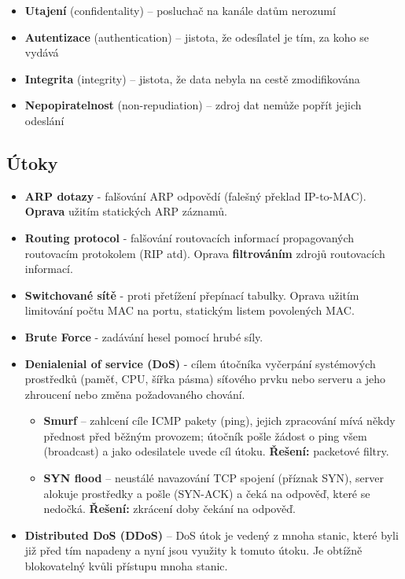 \begin{itemize}
\item \textbf{Utajení} (confidentality) – posluchač na kanále datům nerozumí
\item \textbf{Autentizace} (authentication) – jistota, že odesílatel je tím, za koho se vydává 
\item \textbf{Integrita} (integrity) – jistota, že data nebyla na cestě zmodifikována 
\item \textbf{Nepopiratelnost} (non-repudiation) – zdroj dat nemůže popřít jejich odeslání
\end{itemize}

\subsection*{Útoky}
\begin{itemize}
	\item \textbf{ARP dotazy} - falšování ARP odpovědí (falešný překlad IP-to-MAC). \textbf{Oprava} užitím statických ARP záznamů.
	\item \textbf{Routing protocol} - falšování routovacích informací propagovaných routovacím protokolem (RIP atd). Oprava 	\textbf{filtrováním} zdrojů routovacích informací.
	\item \textbf{Switchované sítě} - proti přetížení přepínací tabulky. Oprava užitím limitování počtu MAC na portu, statickým 	listem povolených MAC.
	\item \textbf{Brute Force} - zadávání hesel pomocí hrubé síly.
	\item \textbf{Denialenial of service (DoS)} - cílem útočníka vyčerpání systémových prostředků (paměť, CPU, šířka pásma) síťového prvku nebo serveru a jeho zhroucení nebo změna požadovaného chování.
\begin{itemize}
	\item \textbf{Smurf} – zahlcení cíle ICMP pakety (ping), jejich zpracování mívá někdy přednost před běžným provozem; útočník pošle žádost o ping všem (broadcast) a jako odesilatele uvede cíl útoku. \textbf{Řešení:} packetové filtry.
	\item \textbf{SYN flood} – neustálé navazování TCP spojení (příznak SYN), server alokuje prostředky a pošle (SYN-ACK) a čeká na odpověď, které se nedočká. \textbf{Řešení:} zkrácení doby čekání na odpověď.
\end{itemize}
	\item \textbf{Distributed DoS (DDoS)} – DoS útok je vedený z mnoha stanic, které byli již před tím napadeny a nyní jsou využity k tomuto útoku. Je obtížně blokovatelný kvůli přístupu mnoha stanic.
\end{itemize}

